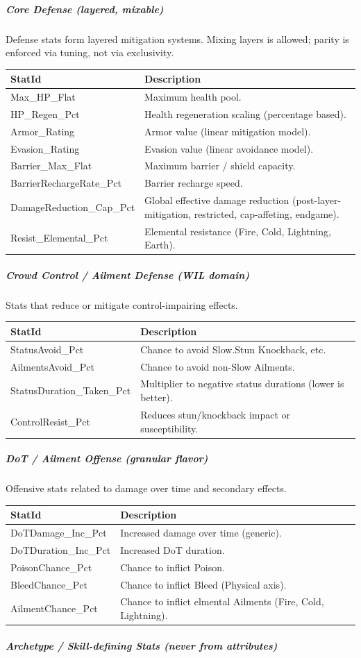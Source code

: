 \subparagraph{Core Defense (layered, mixable)}

Defense stats form layered mitigation systems. Mixing layers is allowed; parity is enforced via tuning, not via exclusivity.

\begin{tabular}{l|p{10cm}}
	\textbf{StatId} & \textbf{Description} \\ \hline
	Max\_HP\_Flat & Maximum health pool. \\
	HP\_Regen\_Pct & Health regeneration scaling (percentage based). \\
	Armor\_Rating & Armor value (linear mitigation model). \\
	Evasion\_Rating & Evasion value (linear avoidance model). \\
	Barrier\_Max\_Flat & Maximum barrier / shield capacity. \\
	BarrierRechargeRate\_Pct & Barrier recharge speed. \\
	DamageReduction\_Cap\_Pct & Global effective damage reduction (post-layer-mitigation, restricted, cap-affeting, endgame). \\
	Resist\_Elemental\_Pct & Elemental resistance (Fire, Cold, Lightning, Earth). \\
\end{tabular}

\subparagraph{Crowd Control / Ailment Defense (WIL domain)}

Stats that reduce or mitigate control-impairing effects.

\begin{tabular}{l|p{10cm}}
	\textbf{StatId} & \textbf{Description} \\ \hline
	StatusAvoid\_Pct & Chance to avoid Slow.Stun Knockback, etc. \\
	AilmentsAvoid\_Pct & Chance to avoid non-Slow Ailments. \\
	StatusDuration\_Taken\_Pct & Multiplier to negative status durations (lower is better). \\
	ControlResist\_Pct & Reduces stun/knockback impact or susceptibility. \\
\end{tabular}

\subparagraph{DoT / Ailment Offense (granular flavor)}

Offensive stats related to damage over time and secondary effects.

\begin{tabular}{l|l}
	\textbf{StatId} & \textbf{Description} \\ \hline
	DoTDamage\_Inc\_Pct & Increased damage over time (generic). \\
	DoTDuration\_Inc\_Pct & Increased DoT duration. \\
	PoisonChance\_Pct & Chance to inflict Poison. \\
	BleedChance\_Pct & Chance to inflict Bleed (Physical axis). \\
	AilmentChance\_Pct & Chance to inflict elmental Ailments (Fire, Cold, Lightning). \\

\end{tabular}
\subparagraph{Archetype / Skill-defining Stats (never from attributes)}

